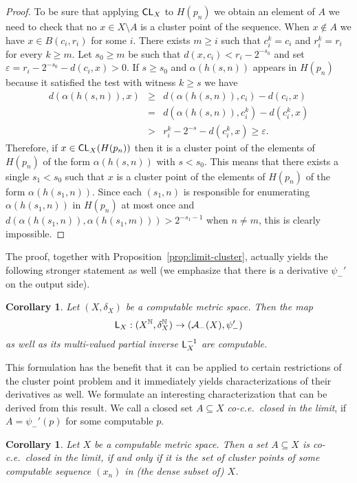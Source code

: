 \documentclass[a4paper]{amsart}
\def\AA{{\mathcal A}}
\def\IN{{\mathbb{N}}}
\def\In{\subseteq}
\def\L{\text{\rm\sffamily L}}
\def\CL{\text{\rm\sffamily CL}}
\newtheorem{corollary}[theorem]{Corollary}
\theoremstyle{definition}
\begin{document}
\begin{proof}
To be sure that applying $\CL_X$ to $H(p_n)$ we obtain an element of
$A$ we need to check that no $x \in X \setminus A$ is a cluster point
of the sequence. When $x \notin A$ we have $x \in B(c_i, r_i)$ for
some $i$. There exists $m \geq i$ such that $c^k_i = c_i$ and $r^k_i
= r_i$ for every $k \geq m$. Let $s_0 \geq m$ be such that $d(x,c_i)
< r_i - 2^{-s_0}$ and set $\varepsilon = r_i - 2^{-s_0} - d(c_i, x) >0$.
If $s \geq s_0$ and $\alpha(h(s,n))$ appears in $H(p_n)$ because it
satisfied the test with witness $k \geq s$ we have
\begin{eqnarray*}
    d(\alpha(h(s,n)), x) & \geq & d(\alpha(h(s,n)), c_i) - d(c_i, x)\\
    & =& d(\alpha(h(s,n)), c^k_i) - d(c^k_i, x)\\
    & >& r^k_i - 2^{-s} - d(c^k_i, x) \geq \varepsilon.
\end{eqnarray*}
Therefore, if $x \in \CL_X (H(p_n))$ then it is a cluster point of
the elements of $H(p_n)$ of the form $\alpha(h(s,n))$ with $s < s_0$.
This means that there exists a single $s_1 <s_0$ such that $x$ is a
cluster point of the elements of $H(p_n)$ of the form
$\alpha(h(s_1,n))$. 
Since each $(s_1,n)$ is responsible for enumerating $\alpha(h(s_1,n))$ in $H(p_n)$ at most once 
and $d(\alpha(h(s_1,n)), \alpha(h(s_1,m))) > 2^{-s_1-1}$
when $n \neq m$, this is clearly impossible.
\end{proof}

The proof, together with Proposition~\ref{prop:limit-cluster}, actually yields the following stronger
statement as well (we emphasize that there is a derivative $\psi_-'$ on the output side).

\begin{corollary}
\label{cor:derivative-closed-choice}
Let $(X,\delta_X)$ be a computable metric space. Then the map
\[\L_X:(X^\IN,\delta_X^\IN)\to(\AA_-(X),\psi_-')\]
as well as its multi-valued partial inverse $\L_X^{-1}$ are computable.
\end{corollary}

This formulation has the benefit that it can be applied to certain restrictions of the
cluster point problem and it immediately yields characterizations of their derivatives
as well. We formulate an interesting characterization that can be derived from this
result. We call a closed set $A\In X$ {\em co-c.e.\ closed in the limit}, if $A=\psi_-'(p)$ 
for some computable $p$.

\begin{corollary}
\label{cor:co-ce-closed-limit}
Let $X$ be a computable metric space. Then a set $A\In X$ is co-c.e.\ closed
in the limit, if and only if it is the set of cluster points of some computable sequence $(x_n)$ in 
(the dense subset of) $X$.
\end{corollary}
\end{document}
